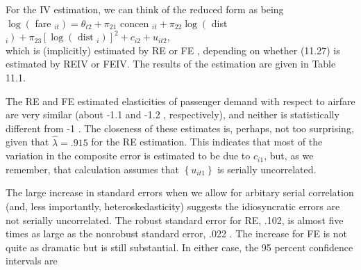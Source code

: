 \documentclass[10pt]{article}
\begin{document}
For the IV estimation, we can think of the reduced form as being\\
$\log \left(\right.$ fare $\left._{i t}\right)=\theta_{t 2}+\pi_{21}$ concen $_{i t}+\pi_{22} \log \left(\right.$ dist $\left._{i}\right)+\pi_{23}\left[\log \left(\text { dist }_{i}\right)\right]^{2}+c_{i 2}+u_{i t 2}$,\\
which is (implicitly) estimated by RE or FE , depending on whether (11.27) is estimated by REIV or FEIV. The results of the estimation are given in Table 11.1.

The RE and FE estimated elasticities of passenger demand with respect to airfare are very similar (about -1.1 and -1.2 , respectively), and neither is statistically different from -1 . The closeness of these estimates is, perhaps, not too surprising, given that $\hat{\lambda}=.915$ for the RE estimation. This indicates that most of the variation in the composite error is estimated to be due to $c_{i 1}$, but, as we remember, that calculation assumes that $\left\{u_{i t 1}\right\}$ is serially uncorrelated.

The large increase in standard errors when we allow for arbitary serial correlation (and, less importantly, heteroskedasticity) suggests the idiosyncratic errors are not serially uncorrelated. The robust standard error for RE, .102, is almost five times as large as the nonrobust standard error, .022 . The increase for FE is not quite as dramatic but is still substantial. In either case, the 95 percent confidence intervals are
\end{document}
